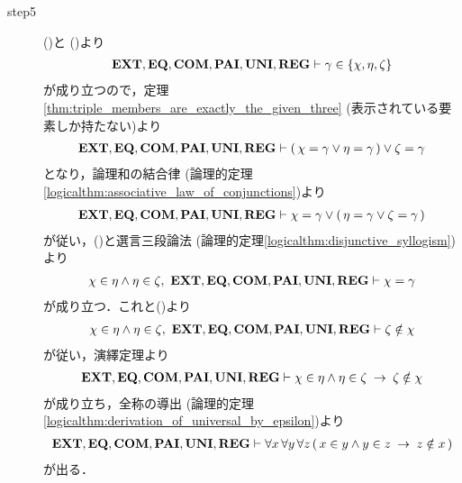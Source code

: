 \begin{sketch}
\begin{description}
			\item[step5] ()と
		()より
		\begin{align}
			\mbox{{\bf EXT}},\mbox{{\bf EQ}},\mbox{\bf COM},\mbox{{\bf PAI}},\mbox{{\bf UNI}},\mbox{{\bf REG}} \vdash \gamma \in \{\chi,\eta,\zeta\}
		\end{align}
		が成り立つので，定理\ref{thm:triple_members_are_exactly_the_given_three}
		(表示されている要素しか持たない)より
		\begin{align}
			\mbox{{\bf EXT}},\mbox{{\bf EQ}},\mbox{\bf COM},\mbox{{\bf PAI}},\mbox{{\bf UNI}},\mbox{{\bf REG}} \vdash 
			(\, \chi = \gamma \vee \eta = \gamma\, ) \vee \zeta = \gamma
		\end{align}
		となり，論理和の結合律
		(論理的定理\ref{logicalthm:associative_law_of_conjunctions})より
		\begin{align}
			\mbox{{\bf EXT}},\mbox{{\bf EQ}},\mbox{\bf COM},\mbox{{\bf PAI}},\mbox{{\bf UNI}},\mbox{{\bf REG}} \vdash 
			\chi = \gamma \vee (\, \eta = \gamma \vee \zeta = \gamma\, )
		\end{align}
		が従い，()と選言三段論法
		(論理的定理\ref{logicalthm:disjunctive_syllogism})より
		\begin{align}
			\chi \in \eta \wedge \eta \in \zeta,\ 
			\EXTAX,\EQAX,\COMAX,\PAIAX,\UNIAX,\REGAX \vdash \chi = \gamma
		\end{align}
		が成り立つ．これと()より
		\begin{align}
			\chi \in \eta \wedge \eta \in \zeta,\ 
			\EXTAX,\EQAX,\COMAX,\PAIAX,\UNIAX,\REGAX \vdash \zeta \notin \chi
		\end{align}
		が従い，演繹定理より
		\begin{align}
			\mbox{{\bf EXT}},\mbox{{\bf EQ}},\mbox{\bf COM},\mbox{{\bf PAI}},\mbox{{\bf UNI}},\mbox{{\bf REG}} \vdash 
			\chi \in \eta \wedge \eta \in \zeta \hspace{0.25em}\rightarrow\hspace{0.25em} \zeta \notin \chi
		\end{align}
		が成り立ち，全称の導出
		(論理的定理\ref{logicalthm:derivation_of_universal_by_epsilon})より
		\begin{align}
			\mbox{{\bf EXT}},\mbox{{\bf EQ}},\mbox{\bf COM},\mbox{{\bf PAI}},\mbox{{\bf UNI}},\mbox{{\bf REG}} \vdash 
			\forall x\, \forall y\, \forall z\, (\, x \in y \wedge y \in z 
			\hspace{0.25em}\rightarrow\hspace{0.25em} z \notin x\, )
		\end{align}
		が出る．
		\QED
		\end{description}
	\end{sketch}